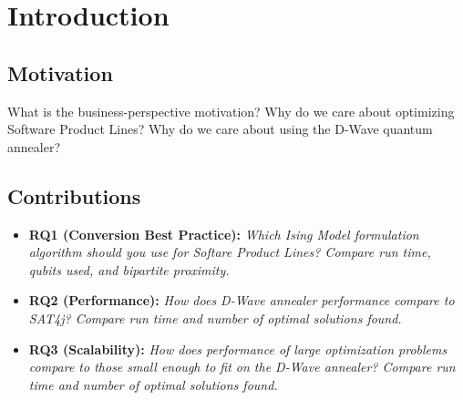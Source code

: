 \documentclass{sig-alternate-05-2015}
\begin{document}
%
%


%
%

%



\section{Introduction}
\subsection{Motivation}
What is the business-perspective motivation? Why do we care about optimizing Software Product Lines? Why do we care about using the D-Wave quantum annealer?

\subsection{Contributions}
\begin{itemize}
\item \textbf{RQ1 (Conversion Best Practice):} \emph{Which Ising Model formulation algorithm should you use for Softare Product Lines? Compare run time, qubits used, and bipartite proximity.}
\item \textbf{RQ2 (Performance):} \emph{How does D-Wave annealer performance compare to SAT4j? Compare run time and number of optimal solutions found.}
\item \textbf{RQ3 (Scalability):} \emph{How does performance of large optimization problems compare to those small enough to fit on the D-Wave annealer? Compare run time and number of optimal solutions found.}
\end{itemize}
\end{document}

